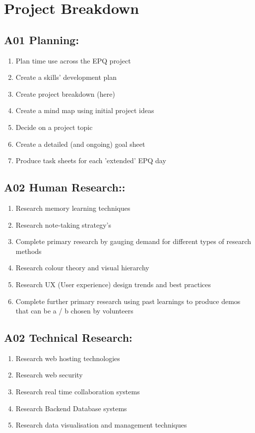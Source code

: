 \section{Project Breakdown}

\subsection{A01 Planning:}
\begin{enumerate}
    \item Plan time use across the EPQ project
    \item Create a skills' development plan
    \item Create project breakdown (here)
    \item Create a mind map using initial project ideas
    \item Decide on a project topic
    \item Create a detailed (and ongoing) goal sheet 
    \item Produce task sheets for each 'extended' EPQ day
\end{enumerate}
\subsection{A02 Human Research::}
\begin{enumerate}
\item Research memory learning techniques
\item Research note-taking strategy's
\item Complete primary research by gauging demand for different types of research methods
\item Research colour theory and visual hierarchy
\item Research UX (User experience) design trends and best practices
\item Complete further primary research using past learnings to produce demos that can be a / b chosen by volunteers
\end{enumerate}
\subsection{A02 Technical Research:}
\begin{enumerate}
    \item Research web hosting technologies
    \item Research web security
    \item Research real time collaboration systems
    \item Research Backend Database systems
    \item Research data visualisation and management techniques
\end{enumerate}
